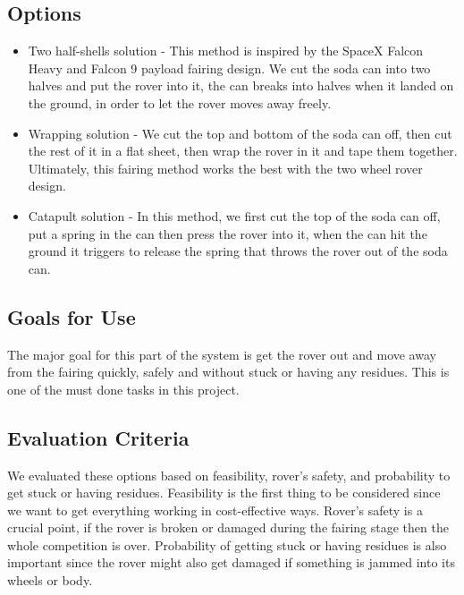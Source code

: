 \documentclass[10pt,letterpaper,onecolumn,journal]{IEEEtran}
\begin{document}
\subsection{Options}
\begin{itemize}
	\item Two half-shells solution\cite{SpaceX} - This method is inspired by the SpaceX Falcon Heavy and Falcon 9 payload fairing design. We cut the soda can into two halves and put the rover into it, the can breaks into halves when it landed on the ground, in order to let the rover moves away freely. 
	\item Wrapping solution - We cut the top and bottom of the soda can off, then cut the rest of it in a flat sheet, then wrap the rover in it and tape them together. Ultimately, this fairing method works the best with the two wheel rover design.  
	\item Catapult solution - In this method, we first cut the top of the soda can off, put a spring in the can then press the rover into it, when the can hit the ground it triggers to release the spring that throws the rover out of the soda can. 
\end{itemize}
\subsection{Goals for Use}
The major goal for this part of the system is get the rover out and move away from the fairing quickly, safely and without stuck or having any residues. This is one of the must done tasks in this project.  

\subsection{Evaluation Criteria}
We evaluated these options based on feasibility, rover's safety, and probability to get stuck or having residues. Feasibility is the first thing to be considered since we want to get everything working in cost-effective ways. Rover's safety is a crucial point, if the rover is broken or damaged during the fairing stage then the whole competition is over. Probability of getting stuck or having residues is also important since the rover might also get damaged if something is jammed into its wheels or body. 
\end{document}
